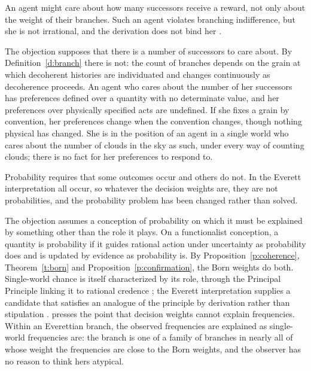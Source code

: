 \documentclass{situationist-preprint}
\begin{document}
\begin{objection}\label{o:price}
An agent might care about how many successors receive a reward, not only about the weight of their branches. Such an agent violates branching indifference, but she is not irrational, and the derivation does not bind her \citep{Price2010}.
\end{objection}

\begin{reply}
The objection supposes that there is a number of successors to care about. By Definition~\ref{d:branch} there is not: the count of branches depends on the grain at which decoherent histories are individuated and changes continuously as decoherence proceeds. An agent who cares about the number of her successors has preferences defined over a quantity with no determinate value, and her preferences over physically specified acts are undefined. If she fixes a grain by convention, her preferences change when the convention changes, though nothing physical has changed. She is in the position of an agent in a single world who cares about the number of clouds in the sky as such, under every way of counting clouds; there is no fact for her preferences to respond to.
\end{reply}

\begin{objection}\label{o:incoherence}
Probability requires that some outcomes occur and others do not. In the Everett interpretation all occur, so whatever the decision weights are, they are not probabilities, and the probability problem has been changed rather than solved.
\end{objection}

\begin{reply}
The objection assumes a conception of probability on which it must be explained by something other than the role it plays. On a functionalist conception, a quantity is probability if it guides rational action under uncertainty as probability does and is updated by evidence as probability is. By Proposition~\ref{p:coherence}, Theorem~\ref{t:born} and Proposition~\ref{p:confirmation}, the Born weights do both. Single-world chance is itself characterized by its role, through the Principal Principle linking it to rational credence \citep{Lewis1980}; the Everett interpretation supplies a candidate that satisfies an analogue of the principle by derivation rather than stipulation \citep{Wallace2012}. \citet{DizadjiBahmani2015} presses the point that decision weights cannot explain frequencies. Within an Everettian branch, the observed frequencies are explained as single-world frequencies are: the branch is one of a family of branches in nearly all of whose weight the frequencies are close to the Born weights, and the observer has no reason to think hers atypical.
\end{reply}
\end{document}
